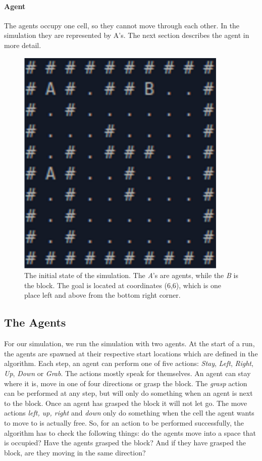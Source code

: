 \paragraph{Agent}
The agents occupy one cell, so they cannot move through each other. In the simulation they are represented by A's. The next section describes the agent in more detail. 

\begin{figure}
\begin{center}
\includegraphics[width=.35\textwidth]{images/environment.png}
\caption{The initial state of the simulation. The \textit{A}'s are agents, while the \textit{B} is the block. The goal is located at coordinates (6,6), which is one place left and above from the bottom right corner.}
\label{2}
\end{center}
\end{figure}

\subsection{The Agents}
For our simulation, we run the simulation with two agents. At the start of a run, the agents are spawned at their respective start locations which are defined in the algorithm. Each step, an agent can perform one of five actions: \textit{Stay}, \textit{Left}, \textit{Right}, \textit{Up}, \textit{Down} or \textit{Grab}. The actions mostly speak for themselves. An agent can stay where it is, move in one of four directions or grasp the block. The \textit{grasp} action can be performed at any step, but will only do something when an agent is next to the block. Once an agent has grasped the block it will not let go. The move actions \textit{left, up, right} and \textit{down} only do something when the cell the agent wants to move to is actually free. So, for an action to be performed successfully, the algorithm has to check the following things: do the agents move into a space that is occupied? Have the agents grasped the block? And if they have grasped the block, are they moving in the same direction? 

